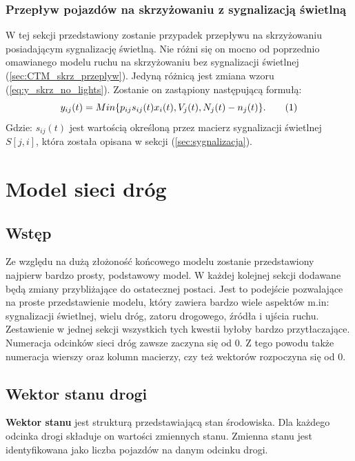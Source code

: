 \documentclass[12pt]{book}
\theoremstyle{plain}
\newcommand\addtag{\refstepcounter{equation}
\renewcommand{\labelenumii}{\theenumii}
\renewcommand{\theenumii}{\theenumi.\arabic{enumii}.}
\tag{\theequation}}
\newcommand{\myref}[1]{(\ref{#1})}
\begin{document}
\subsection{Przepływ pojazdów na skrzyżowaniu z sygnalizacją świetlną} \label{sec:CTM_sygnalizacja}
W tej sekcji przedstawiony zostanie przypadek przepływu na skrzyżowaniu posiadającym sygnalizację świetlną. Nie różni się on mocno od poprzednio omawianego modelu ruchu na skrzyżowaniu bez sygnalizacji świetlnej \myref{sec:CTM_skrz_przeplyw}. Jedyną różnicą jest zmiana wzoru \myref{eq:y_skrz_no_lights}. Zostanie on zastąpiony następującą formułą:
\[ y_{ij}(t)= Min\{p_{ij}s_{ij}(t) x_{i}(t),V_j(t),N_j(t)-n_j(t)\}. \addtag \label{eq:y_skrz_lights}\]
Gdzie: $s_{ij}(t)$ jest wartością określoną przez macierz sygnalizacji świetlnej $S[j,i]$, która została opisana w sekcji \myref{sec:sygnalizacja}.


\chapter{Model sieci dróg} \label{chapter:model_sieci_drog}
\section{Wstęp}
Ze względu na dużą złożoność końcowego modelu zostanie przedstawiony najpierw bardzo prosty, podstawowy model. W każdej kolejnej sekcji dodawane będą zmiany przybliżające do ostatecznej postaci. Jest to podejście pozwalające na proste przedstawienie modelu, który zawiera bardzo wiele aspektów m.in:
sygnalizacji świetlnej, wielu dróg, zatoru drogowego, źródła i ujścia ruchu. Zestawienie w jednej sekcji wszystkich tych kwestii byłoby bardzo przytłaczające. Numeracja odcinków sieci dróg zawsze zaczyna się od 0. Z tego powodu także numeracja wierszy oraz kolumn macierzy, czy też wektorów rozpoczyna się od 0.


\section{Wektor stanu drogi} \label{sec:wektor_stanu_drogi}
\textbf{Wektor stanu} jest strukturą przedstawiającą stan środowiska. Dla każdego odcinka drogi składuje on wartości zmiennych stanu. Zmienna stanu jest identyfikowana jako liczba pojazdów na danym odcinku drogi. 
\end{document}
